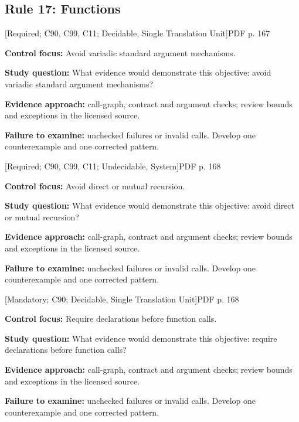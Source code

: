 \documentclass[10pt,letterpaper]{article}
\begin{document}
\subsection{Rule 17: Functions}
 \textsf{\footnotesize [Required; C90, C99, C11; Decidable, Single Translation Unit]}\hfill{\footnotesize PDF p. 167}\par
\textbf{Control focus:} Avoid variadic standard argument mechanisms.\par
\textbf{Study question:} What evidence would demonstrate this objective: avoid variadic standard argument mechanisms?\par
\textbf{Evidence approach:} call-graph, contract and argument checks; review bounds and exceptions in the licensed source.\par
\textbf{Failure to examine:} unchecked failures or invalid calls. Develop one counterexample and one corrected pattern.\par
\smallskip
{}
 \textsf{\footnotesize [Required; C90, C99, C11; Undecidable, System]}\hfill{\footnotesize PDF p. 168}\par
\textbf{Control focus:} Avoid direct or mutual recursion.\par
\textbf{Study question:} What evidence would demonstrate this objective: avoid direct or mutual recursion?\par
\textbf{Evidence approach:} call-graph, contract and argument checks; review bounds and exceptions in the licensed source.\par
\textbf{Failure to examine:} unchecked failures or invalid calls. Develop one counterexample and one corrected pattern.\par
\smallskip
{}
 \textsf{\footnotesize [Mandatory; C90; Decidable, Single Translation Unit]}\hfill{\footnotesize PDF p. 168}\par
\textbf{Control focus:} Require declarations before function calls.\par
\textbf{Study question:} What evidence would demonstrate this objective: require declarations before function calls?\par
\textbf{Evidence approach:} call-graph, contract and argument checks; review bounds and exceptions in the licensed source.\par
\textbf{Failure to examine:} unchecked failures or invalid calls. Develop one counterexample and one corrected pattern.\par
\end{document}
